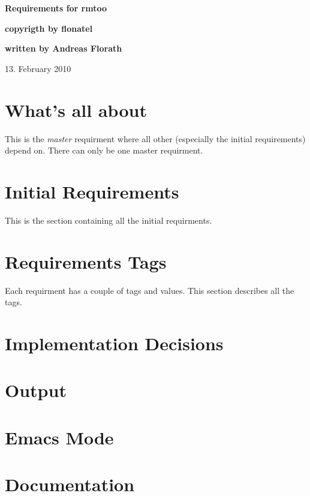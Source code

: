 \documentclass{article}
\begin{document}
\thispagestyle{empty}

\vfill

{\LARGE\textbf{Requirements for rmtoo}}

\vfill

{\Large\textbf{copyrigth by flonatel}}

\vfill

{\Large\textbf{written by Andreas Florath}}

\vfill

13. February 2010

\vfill

\newpage

\tableofcontents

\newpage

\section{What's all about}
This is the \textsl{master} requirment where all other (especially the
initial requirements) depend on. There can only be one master requirment.


\section{Initial Requirements}
This is the section containing all the initial requirments.









\section{Requirements Tags}
Each requirment has a couple of tags and values.  This section
describes all the tags.







\section{Implementation Decisions}




\section{Output}




\section{Emacs Mode}



\section{Documentation}

\end{document}
